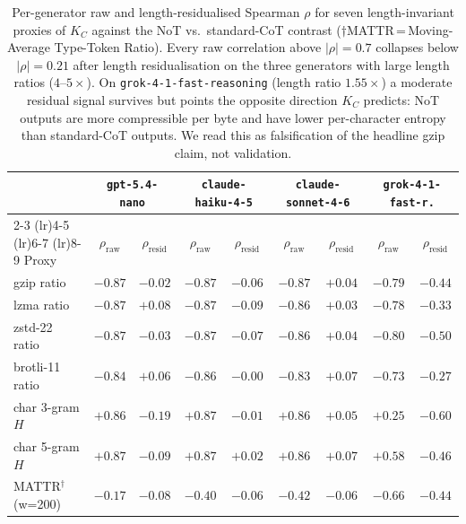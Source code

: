 \documentclass[11pt]{article}
\begin{document}
\begin{table}[!tbp]
\centering
\small
\setlength{\tabcolsep}{6pt}
\begin{tabular}{lcccccccc}
\toprule
& \multicolumn{2}{c}{\texttt{gpt-5.4-nano}}
& \multicolumn{2}{c}{\texttt{claude-haiku-4-5}}
& \multicolumn{2}{c}{\texttt{claude-sonnet-4-6}}
& \multicolumn{2}{c}{\texttt{grok-4-1-fast-r.}} \\
\cmidrule(lr){2-3} \cmidrule(lr){4-5} \cmidrule(lr){6-7} \cmidrule(lr){8-9}
Proxy & $\rho_{\text{raw}}$ & $\rho_{\text{resid}}$
      & $\rho_{\text{raw}}$ & $\rho_{\text{resid}}$
      & $\rho_{\text{raw}}$ & $\rho_{\text{resid}}$
      & $\rho_{\text{raw}}$ & $\rho_{\text{resid}}$ \\
\midrule
gzip ratio                & $-0.87$ & $-0.02$ & $-0.87$ & $-0.06$ & $-0.87$ & $+0.04$ & $-0.79$ & $-0.44$ \\
lzma ratio                & $-0.87$ & $+0.08$ & $-0.87$ & $-0.09$ & $-0.86$ & $+0.03$ & $-0.78$ & $-0.33$ \\
zstd-22 ratio             & $-0.87$ & $-0.03$ & $-0.87$ & $-0.07$ & $-0.86$ & $+0.04$ & $-0.80$ & $-0.50$ \\
brotli-11 ratio           & $-0.84$ & $+0.06$ & $-0.86$ & $-0.00$ & $-0.83$ & $+0.07$ & $-0.73$ & $-0.27$ \\
char 3-gram $H$           & $+0.86$ & $-0.19$ & $+0.87$ & $-0.01$ & $+0.86$ & $+0.05$ & $+0.25$ & $-0.60$ \\
char 5-gram $H$           & $+0.87$ & $-0.09$ & $+0.87$ & $+0.02$ & $+0.86$ & $+0.07$ & $+0.58$ & $-0.46$ \\
MATTR$^{\dagger}$ (w=200) & $-0.17$ & $-0.08$ & $-0.40$ & $-0.06$ & $-0.42$ & $-0.06$ & $-0.66$ & $-0.44$ \\
\bottomrule
\end{tabular}
\caption{Per-generator raw and length-residualised Spearman $\rho$ for
seven length-invariant proxies of $K_C$ against the NoT vs.\
standard-CoT contrast ($\dagger$MATTR\,=\,Moving-Average Type-Token
Ratio). Every raw correlation above $|\rho|{=}0.7$ collapses below
$|\rho|{=}0.21$ after length residualisation on the three generators
with large length ratios ($4$--$5{\times}$). On
\texttt{grok-4-1-fast-reasoning} (length ratio $1.55{\times}$) a
moderate residual signal survives but points the opposite direction
$K_C$ predicts: NoT outputs are more compressible per byte and have
lower per-character entropy than standard-CoT outputs. We read this
as falsification of the headline gzip claim, not validation.}
\label{tab:kc_corr}
\end{table}
\end{document}
